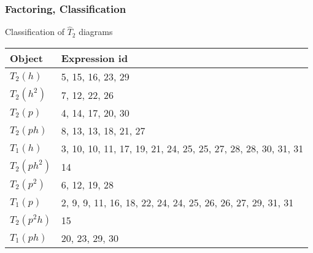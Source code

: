 \begin{frame}
    \frametitle{Factoring, Classification}

\begin{block}{Classification of $\hat{T}_2$ diagrams}
\small
\begin{tabular}{|l||l|}
    \hline
    Object & Expression id \\
    \hline
    $T_2(h)$ & 5, 15, 16, 23, 29 \\
    \hline
    $T_2(h^2)$ & 7, 12, 22, 26 \\
    \hline
    $T_2(p)$ & 4, 14, 17, 20, 30 \\
    \hline
    $T_2(ph)$ & 8, 13, 13, 18, 21, 27 \\
    \hline
    $T_1(h)$ & 3, 10, 10, 11, 17, 19, 21, 24, 25, 25, 27, 28, 28, 30, 31, 31 \\
    \hline
    $T_2(ph^2)$ & 14 \\
    \hline
    $T_2(p^2)$ & 6, 12, 19, 28 \\
    \hline
    $T_1(p)$ & 2, 9, 9, 11, 16, 18, 22, 24, 24, 25, 26, 26, 27, 29, 31, 31 \\
    \hline
    $T_2(p^2h)$ & 15 \\
    \hline
    $T_1(ph)$ & 20, 23, 29, 30 \\
    \hline
\end{tabular}

\end{block}
\end{frame}


